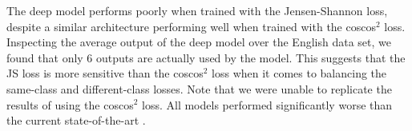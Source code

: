 The deep model performs poorly when trained with the Jensen-Shannon loss, despite a similar architecture performing well when trained with the coscos$^2$ loss.
Inspecting the average output of the deep model over the English data set, we found that only 6 outputs are actually used by the model.
This suggests that the JS loss is more sensitive than the coscos$^2$ loss when it comes to balancing the same-class and different-class losses. 
Note that we were unable to replicate the results of \textcite{thiolliere2015hybrid} using the coscos$^2$ loss.
All models performed significantly worse than the current state-of-the-art \parencite{heck2016unsupervised}.


